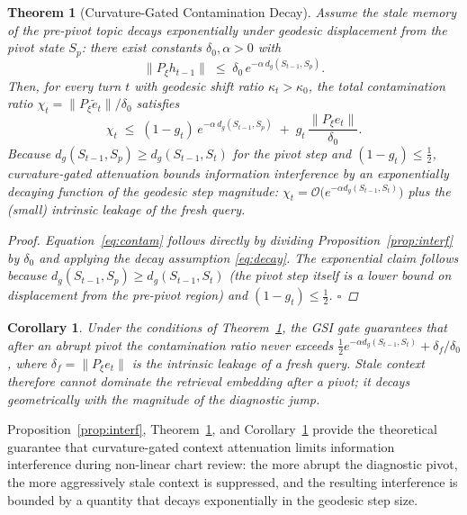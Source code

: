 \documentclass[11pt]{article}
\newtheorem{theorem}[proposition]{Theorem}
\newtheorem{corollary}[proposition]{Corollary}
\begin{document}
\begin{theorem}[Curvature-Gated Contamination Decay]
\label{thm:contam}
Assume the stale memory of the pre-pivot topic decays exponentially under geodesic displacement from the pivot state $S_p$: there exist constants $\delta_0, \alpha>0$ with
\begin{equation}
\bigl\|P_\xi h_{t-1}\bigr\| \;\le\; \delta_0\, e^{-\alpha\, d_g(S_{t-1},S_p)}.
\label{eq:decay}
\end{equation}
Then, for every turn $t$ with geodesic shift ratio $\kappa_t>\kappa_0$, the total contamination ratio $\chi_t = \|P_\xi \tilde{e}_t\|/\delta_0$ satisfies
\begin{equation}
\chi_t \;\le\; (1-g_t)\, e^{-\alpha\, d_g(S_{t-1},S_p)} \;+\; g_t\,\frac{\|P_\xi e_t\|}{\delta_0}.
\label{eq:contam}
\end{equation}
Because $d_g(S_{t-1},S_p)\ge d_g(S_{t-1},S_t)$ for the pivot step and $(1-g_t)\le \tfrac12$, curvature-gated attenuation bounds information interference by an exponentially decaying function of the geodesic step magnitude: $\chi_t = \mathcal{O}\bigl(e^{-\alpha d_g(S_{t-1},S_t)}\bigr)$ plus the (small) intrinsic leakage of the fresh query.

\begin{proof}
Equation~\ref{eq:contam} follows directly by dividing Proposition~\ref{prop:interf} by $\delta_0$ and applying the decay assumption \eqref{eq:decay}. The exponential claim follows because $d_g(S_{t-1},S_p)\ge d_g(S_{t-1},S_t)$ (the pivot step itself is a lower bound on displacement from the pre-pivot region) and $(1-g_t)\le \tfrac12$. \hfill$\square$
\end{proof}

\end{theorem}
\begin{corollary}
\label{cor:closure}
Under the conditions of Theorem~\ref{thm:contam}, the GSI gate guarantees that after an abrupt pivot the contamination ratio never exceeds $\tfrac12 e^{-\alpha d_g(S_{t-1},S_t)} + \delta_f/\delta_0$, where $\delta_f = \|P_\xi e_t\|$ is the intrinsic leakage of a fresh query. Stale context therefore cannot dominate the retrieval embedding after a pivot; it decays geometrically with the magnitude of the diagnostic jump.\end{corollary}

Proposition~\ref{prop:interf}, Theorem~\ref{thm:contam}, and Corollary~\ref{cor:closure} provide the theoretical guarantee that curvature-gated context attenuation limits information interference during non-linear chart review: the more abrupt the diagnostic pivot, the more aggressively stale context is suppressed, and the resulting interference is bounded by a quantity that decays exponentially in the geodesic step size.
\end{document}
